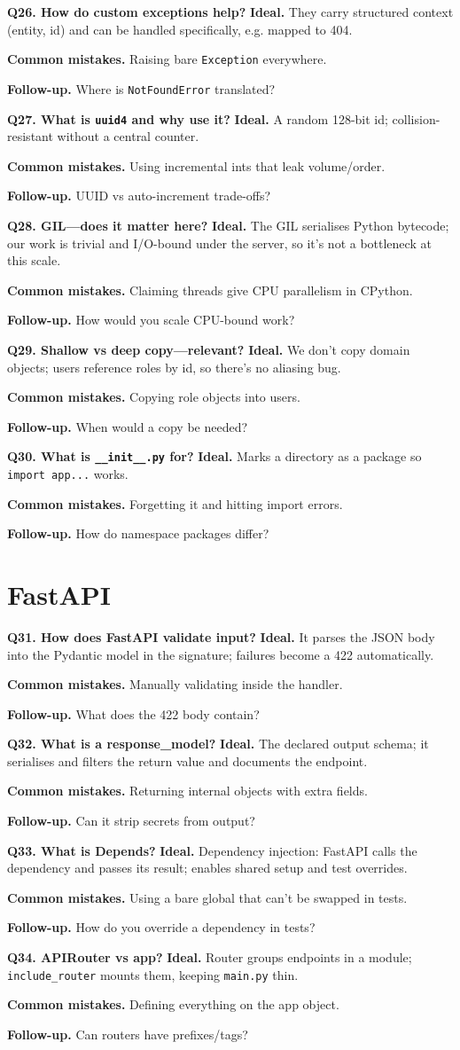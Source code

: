 \documentclass[11pt,a4paper]{report}
\newcommand{\qa}[3]{%
  \textbf{Ideal.} #1\par
  \textbf{Common mistakes.} #2\par
  \textbf{Follow-up.} #3\par
  \vspace{4pt}
}
\begin{document}
\textbf{Q26. How do custom exceptions help?}
\qa{They carry structured context (entity, id) and can be handled specifically,
e.g. mapped to 404.}
{Raising bare \texttt{Exception} everywhere.}
{Where is \texttt{NotFoundError} translated?}

\textbf{Q27. What is \texttt{uuid4} and why use it?}
\qa{A random 128-bit id; collision-resistant without a central counter.}
{Using incremental ints that leak volume/order.}
{UUID vs auto-increment trade-offs?}

\textbf{Q28. GIL---does it matter here?}
\qa{The GIL serialises Python bytecode; our work is trivial and I/O-bound under
the server, so it's not a bottleneck at this scale.}
{Claiming threads give CPU parallelism in CPython.}
{How would you scale CPU-bound work?}

\textbf{Q29. Shallow vs deep copy---relevant?}
\qa{We don't copy domain objects; users reference roles by id, so there's no
aliasing bug.}
{Copying role objects into users.}
{When would a copy be needed?}

\textbf{Q30. What is \texttt{\_\_init\_\_.py} for?}
\qa{Marks a directory as a package so \texttt{import app...} works.}
{Forgetting it and hitting import errors.}
{How do namespace packages differ?}

\section{FastAPI}

\textbf{Q31. How does FastAPI validate input?}
\qa{It parses the JSON body into the Pydantic model in the signature; failures
become a 422 automatically.}
{Manually validating inside the handler.}
{What does the 422 body contain?}

\textbf{Q32. What is a response\_model?}
\qa{The declared output schema; it serialises and filters the return value and
documents the endpoint.}
{Returning internal objects with extra fields.}
{Can it strip secrets from output?}

\textbf{Q33. What is Depends?}
\qa{Dependency injection: FastAPI calls the dependency and passes its result;
enables shared setup and test overrides.}
{Using a bare global that can't be swapped in tests.}
{How do you override a dependency in tests?}

\textbf{Q34. APIRouter vs app?}
\qa{Router groups endpoints in a module; \texttt{include\_router} mounts them,
keeping \texttt{main.py} thin.}
{Defining everything on the app object.}
{Can routers have prefixes/tags?}
\end{document}

